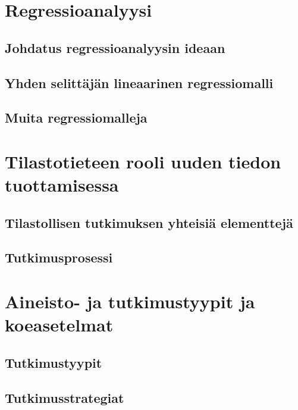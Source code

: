\documentclass[
]{book}
\begin{document}
\hypertarget{luku8}{%
\chapter{Regressioanalyysi}\label{luku8}}

\hypertarget{alaluku81}{%
\section{Johdatus regressioanalyysin ideaan}\label{alaluku81}}

\hypertarget{alaluku82}{%
\section{Yhden selittäjän lineaarinen regressiomalli}\label{alaluku82}}

\hypertarget{alaluku83}{%
\section{Muita regressiomalleja}\label{alaluku83}}

\hypertarget{luku9}{%
\chapter{Tilastotieteen rooli uuden tiedon tuottamisessa}\label{luku9}}

\hypertarget{alaluku91}{%
\section{Tilastollisen tutkimuksen yhteisiä elementtejä}\label{alaluku91}}

\hypertarget{alaluku92}{%
\section{Tutkimusprosessi}\label{alaluku92}}

\hypertarget{luku10}{%
\chapter{Aineisto- ja tutkimustyypit ja koeasetelmat}\label{luku10}}

\hypertarget{alaluku101}{%
\section{Tutkimustyypit}\label{alaluku101}}

\hypertarget{alaluku102}{%
\section{Tutkimusstrategiat}\label{alaluku102}}
\end{document}
